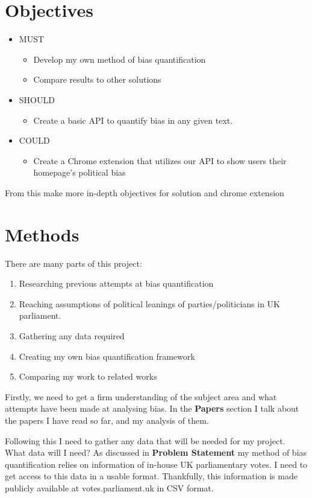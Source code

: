 \documentclass[a4paper,fleqn,12pt]{article}
\begin{document}
\section{Objectives}
\begin{itemize}
    \item MUST
    \begin{itemize}
        \item Develop my own method of bias quantification
        \item Compare results to other solutions
    \end{itemize}
    \item SHOULD
    \begin{itemize}
        \item Create a basic API to quantify bias in any given text.
    \end{itemize}
    \item COULD
    \begin{itemize}
        \item Create a Chrome extension that utilizes our API to show users their homepage's political bias
    \end{itemize}
\end{itemize}

From this make more in-depth objectives for solution and chrome extension

\section{Methods}
There are many parts of this project:
\begin{enumerate}
    \item Researching previous attempts at bias quantification
    \item Reaching assumptions of political leanings of parties/politicians in UK parliament.
    \item Gathering any data required
    \item Creating my own bias quantification framework
    \item Comparing my work to related works
\end{enumerate}

Firstly, we need to get a firm understanding of the subject area and what attempts have been made at analysing bias. In the \textbf{Papers} section I talk about the papers I have read so far, and my analysis of them.



Following this I need to gather any data that will be needed for my project. What data will I need? As discussed in \textbf{Problem Statement} my method of bias quantification relies on information of in-house UK parliamentary votes. I need to get access to this data in a usable format. Thankfully, this information is made publicly available at votes.parliament.uk in CSV format.
\end{document}
